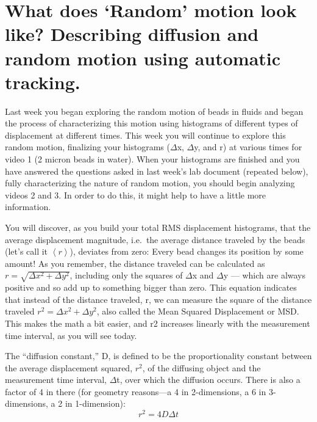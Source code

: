 \section{What does ‘Random’ motion look like? Describing diffusion and random motion using automatic tracking.}
Last week you began exploring the random motion of beads in fluids and began the process of characterizing this motion using histograms of different types of displacement at different times. 
This week you will continue to explore this random motion, finalizing your histograms ($\Delta$x, $\Delta$y, and r) at various times for video 1 (2 micron beads in water). 
When your histograms are finished and you have answered the questions asked in last week's lab document (repeated below), fully characterizing the nature of random motion, you should begin analyzing videos 2 and 3. 
In order to do this, it might help to have a little more information. 
\par 
You will discover, as you build your total RMS displacement histograms, that the average displacement magnitude, i.e.\ the average distance traveled by the beads (let’s call it $\left< r \right>$), deviates from zero: Every bead changes its position by some amount! 
As you remember, the distance traveled can be calculated as $r = \sqrt{\Delta x^{2}+\Delta y^{2}}$, including only the squares of $\Delta$x and $\Delta$y — which are always positive and so add up to something bigger than zero. 
This equation indicates that instead of the distance traveled, r, we can measure the square of the distance traveled $r^{2} = \Delta x^{2} + \Delta y^{2}$, also called the Mean Squared Displacement or MSD. 
This makes the math a bit easier, and r2 increases linearly with the measurement time interval, as you will see today. 
\par 
The ``diffusion constant,'' D, is defined to be the proportionality constant between the average displacement squared, $r^{2}$, of the diffusing object and the measurement time interval, $\Delta$t, over which the diffusion occurs. 
There is also a factor of 4 in there (for geometry reasons—a 4 in 2-dimensions, a 6 in 3-dimensions, a 2 in 1-dimension):
\begin{equation}
r^{2} = 4 D \Delta t
\end{equation} 
